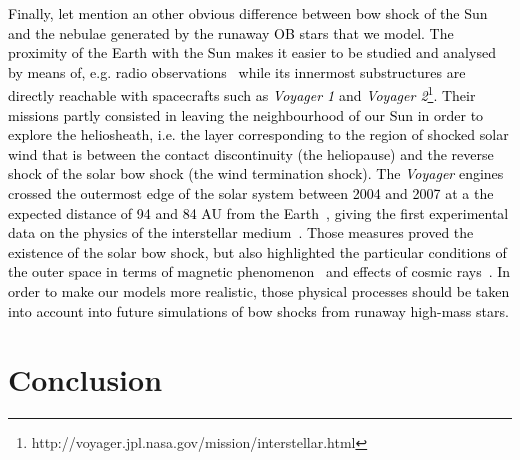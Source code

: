 \documentclass[useAMS,usenatbib]{mn2e}
\begin{document}
\textcolor{black}{
Finally, let mention an other obvious difference between bow shock of the Sun and 
the nebulae generated by the runaway OB stars that we model. The proximity of the Earth 
with the Sun makes it easier to be studied and analysed by means of, e.g. radio 
observations~\citep{baranov_sovastronlett_1_1975} while its innermost 
substructures are directly reachable with spacecrafts such as {\it Voyager 1} and 
{\it Voyager 2}\footnote{http://voyager.jpl.nasa.gov/mission/interstellar.html}. 
Their missions partly consisted in leaving the neighbourhood of our Sun in order 
to explore the heliosheath, i.e. the layer corresponding to the region of shocked solar wind 
that is between the contact discontinuity (the heliopause) and the 
reverse shock of the solar bow shock (the wind termination shock). The {\it Voyager} 
engines crossed the outermost edge of the solar system between 2004 and 2007 at a the expected 
distance of 94 and 84 AU from the Earth~\citep{linde_jgr_103_1998}, giving 
the first experimental data on 
the physics of the interstellar medium~\citep{chalov_mnras_455_2016}. Those 
measures proved the existence of the solar bow shock, but also highlighted the 
particular conditions of the outer space in terms of magnetic 
phenomenon~\citep{richardson_2016} and effects of cosmic 
rays~\citep{webber_2016}. In order to make our models more realistic, those 
physical processes should be taken into account into future simulations of bow 
shocks from runaway high-mass stars.  
}






\section{Conclusion}
\label{section:conclusion}
\end{document}
